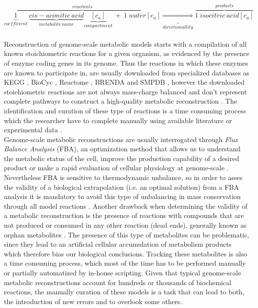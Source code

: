 \begin{equation}
\label{sr}
\overbrace{\underbrace{1}_{coefficient}\ \underbrace{cis-aconitic\ acid}_{metabolite\ name}\underbrace{[c_a]}_{compartment}\ +\ 1\ water[c_a]}^{reactants} \underbrace{\Rightarrow}_{directionallity} \overbrace{1\ isocitric\ acid[c_a]}^{products}
\end{equation}\\

Reconstruction of genome-scale metabolic models starts with a compilation of all known stoichiometric reactions for a given organism, as evidenced by the presence of enzyme coding genes in its genome. Thus the reactions in which these enzymes are known to  participate in, are usually downloaded from specialized databases as KEGG \cite{Kanehisa2000}, BioCyc \cite{Caspi2014}, Reactome \cite{Croft2014}, BRENDA \cite{Chang2015} and SMPDB \cite{Jewison2014}, however the downloaded stoichiometric reactions are not always mass-charge balanced and don't represent complete pathways to construct a high-quality metabolic reconstruction \cite{Thiele2010, Gevorgyan2008}. The identification and curation of these type of reactions is a time consuming process which  the researcher have to complete manually using available literature or experimental data \cite{Lakshmanan2014}.\\

Genome-scale metabolic reconstructions are usually interrogated through \emph{Flux Balance Analysis} (FBA), an optimization method that allows us to understand the metabolic status of the cell, improve the production capability of a desired product or make a rapid evaluation of cellular physiology at genome-scale \cite{Kim2008,Park2009}. Nevertheless FBA is sensitive to thermodynamic unbalance, so in order to asses the validity of a biological extrapolation (i.e. an optimal solution) from a FBA analysis it is mandatory to avoid this type of unbalancing in mass conservation through all model reactions \cite{Reznik2013}. Another drawback when determining  the validity of a metabolic reconstruction is the presence of  reactions with compounds that are not produced or consumed in any other reaction (dead ends), generally known as orphan metabolites  \cite{Park2009, Thiele2010}. The presence of this type of metabolites can be problematic, since they lead to an artificial cellular  accumulation of  metabolism products which therefore  bias our biological conclusions. Tracking these metabolites is also a time consuming process, which most of the time has to be performed manually or partially automatized by in-house scripting. Given that typical genome-scale metabolic reconstructions account for hundreds or thousands of biochemical reactions, the manually curation of these models is a task that can lead to both, the introduction of new errors and to overlook some others.\\

